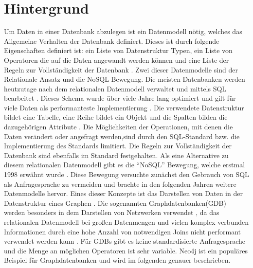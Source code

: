 
\chapter{Hintergrund} %

\label{Kaptiel1} %


\newcommand{\keyword}[1]{\textit{#1}}
\newcommand{\tabhead}[1]{\textbf{#1}}
\newcommand{\code}[1]{\texttt{#1}}
\newcommand{\file}[1]{\texttt{\bfseries#1}}
\newcommand{\option}[1]{\texttt{\itshape#1}}

Um Daten in einer Datenbank abzulegen ist ein Datenmodell nötig, welches  das Allgemeine Verhalten der Datenbank definiert. Dieses ist durch folgende Eigenschaften definiert ist: ein Liste von Datenstruktur Typen, ein Liste von Operatoren die auf die Daten angewandt werden können und eine Liste der Regeln zur Vollständigkeit der Datenbank \parencite{codd1981data}. Zwei dieser Datenmodelle sind der Relationale-Ansatz und die NoSQL-Bewegung. Die meisten Datenbanken werden heutzutage nach dem relationalen Datenmodell verwaltet und mittels SQL bearbeitet \parencite{miller2013graph}. Dieses Schema wurde über viele Jahre lang optimiert und gilt für viele Daten als performanteste Implementierung \parencite{miller2013graph}. Die verwendete Datenstruktur bildet eine Tabelle, eine Reihe bildet ein Objekt und die Spalten bilden die dazugehörigen Attribute \parencite{miller2013graph}. Die Möglichkeiten der Operationen, mit denen die Daten verändert oder angefragt werden,sind durch den SQL-Standard bzw. die Implementierung des  Standards limitiert. Die Regeln zur Vollständigkeit der Datenbank sind ebenfalls im Standard festgehalten.  Als eine Alternative zu diesem relationalen Datenmodell gibt es die “NoSQL” Bewegung, welche erstmal 1998 erwähnt wurde \parencite{strauch2011nosql}. Diese Bewegung versuchte zunächst den Gebrauch von SQL als Anfragesprache zu vermeiden und brachte in den folgenden Jahren weitere Datenmodelle hervor. Eines dieser Konzepte ist das Darstellen von Daten in der Datenstruktur eines Graphen \parencite{miller2013graph}. Die sogenannten Graphdatenbanken(GDB) werden besonders in dem Darstellen von Netzwerken verwendet \parencite{han2011survey}, da das relationalen Datenmodell bei großen Datenmengen und vielen komplex verbunden Informationen durch eine hohe Anzahl von notwendigen Joins nicht performant verwendet werden kann \parencite{miller2013graph}. Für GDBs gibt es keine standardisierte Anfragesprache und  die Menge an möglichen Operatoren ist sehr variable. Neo4j ist ein populäres Beispiel für Graphdatenbanken und wird im folgenden genauer beschrieben.

